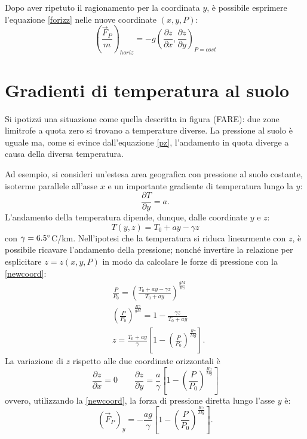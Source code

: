 Dopo aver ripetuto il ragionamento per la coordinata $y$, è possibile esprimere l'equazione \eqref{forizz} nelle nuove coordinate $(x, y, P)$:
\begin{equation}\label{newcoord}
	\left(\frac{\vec{F}_P}{m}\right)_{horiz}=-g\left(\frac{\partial z}{\partial x}, \frac{\partial z}{\partial y}\right)_{P=cost}
\end{equation}

\section{Gradienti di temperatura al suolo}
Si ipotizzi una situazione come quella descritta in figura (FARE): due zone limitrofe a quota zero si trovano a temperature diverse. La pressione al suolo è uguale ma, come si evince dall'equazione \eqref{pz}, l'andamento in quota diverge a causa della diversa temperatura.

Ad esempio, si consideri un'estesa area geografica con pressione al suolo costante, isoterme parallele all'asse $x$ e un importante gradiente di temperatura lungo la $y$: 
\begin{equation}
	\frac{\partial T}{\partial y}=a.
\end{equation}
L'andamento della temperatura dipende, dunque, dalle coordinate $y$ e $z$:
\begin{equation}
	T(y,z)=T_0+ay-\gamma z
\end{equation}
con $\gamma=6.5\degree$C/km. Nell'ipotesi che la temperatura si riduca linearmente con $z$, è possibile ricavare l'andamento della pressione; nonché invertire la relazione per esplicitare $z=z(x,y,P)$ in modo da calcolare le forze di pressione con la \eqref{newcoord}:
\begin{align}
&\frac{P}{P_0}=\left(\frac{T_0+ay-\gamma z}{T_0+ay}\right)^{\frac{gM}{R\gamma}}\\
&\left(\frac{P}{P_0}\right)^{\frac{R\gamma}{gM}}=1-\frac{\gamma z}{T_0+ay}\\
&z=\frac{T_0+ay}{\gamma}\left[1-\left(\frac{P}{P_0}\right)^{\frac{R\gamma}{Mg}}\right].
\end{align}
La variazione di $z$ rispetto alle due coordinate orizzontali è
\begin{equation}
	\frac{\partial z}{\partial x}=0 \qquad \frac{\partial z}{\partial y}=\frac{a}{\gamma}\left[1-\left(\frac{P}{P_0}\right)^{\frac{R\gamma}{Mg}}\right]
\end{equation}
ovvero, utilizzando la \eqref{newcoord}, la forza di pressione diretta lungo l'asse $y$ è:
\begin{equation}
	(\vec{F}_P)_y=-\frac{ag}{\gamma}\left[1-\left(\frac{P}{P_0}\right)^{\frac{R\gamma}{Mg}}\right].
\end{equation}

